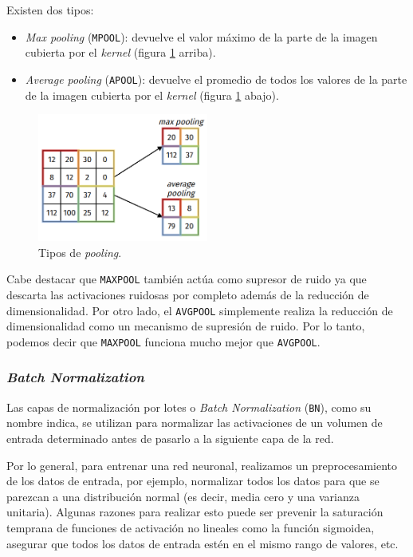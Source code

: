 \documentclass[a4paper,12pt]{article}
\begin{document}
Existen dos tipos:
\begin{itemize}[noitemsep, topsep=2pt]
	\item \textit{Max pooling} (\texttt{MPOOL}): devuelve el valor máximo de la parte de la imagen cubierta por el \textit{kernel} (figura \ref{fig:type-pooling} arriba).
	\item \textit{Average pooling} (\texttt{APOOL}): devuelve el promedio de todos los valores de la parte de la imagen cubierta por el \textit{kernel} (figura \ref{fig:type-pooling} abajo).
\end{itemize}

\begin{figure}[H]
	\begin{center}				
		\includegraphics[width=0.5\textwidth]{tesis_45.png}
		\caption{Tipos de \textit{pooling}.}
		\label{fig:type-pooling}
	\end{center}
\end{figure}

Cabe destacar que \texttt{MAXPOOL} también actúa como supresor de ruido ya que descarta las activaciones ruidosas por completo además de la reducción de dimensionalidad. Por otro lado, el \texttt{AVGPOOL} simplemente realiza la reducción de dimensionalidad como un mecanismo de supresión de ruido. Por lo tanto, podemos decir que \texttt{MAXPOOL} funciona mucho mejor que \texttt{AVGPOOL}.

\subsubsection{\textit{Batch Normalization}}

Las capas de normalización por lotes o \textit{Batch Normalization} (\texttt{BN}), como su nombre indica, se utilizan para normalizar las activaciones de un volumen de entrada determinado antes de pasarlo a la siguiente capa de la red.

\clearpage

Por lo general, para entrenar una red neuronal, realizamos un preprocesamiento de los datos de entrada, por ejemplo, normalizar todos los datos para que se parezcan a una distribución normal (es decir, media cero y una varianza unitaria). Algunas razones para realizar esto puede ser prevenir la saturación temprana de funciones de activación no lineales como la función sigmoidea, asegurar que todos los datos de entrada estén en el mismo rango de valores, etc. \citep{bn}
\end{document}
